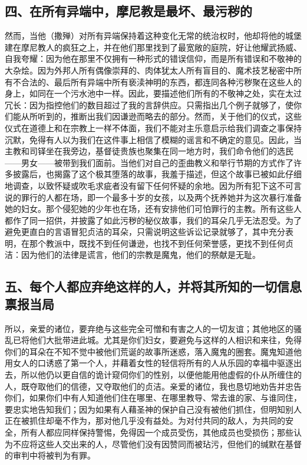 
\subsection{四、在所有异端中，摩尼教是最坏、最污秽的}

然而，当他（撒殚）对所有异端保持着这种变化无常的统治权时，他却将他的城堡建在摩尼教人的疯狂之上，并在他们那里找到了最宽敞的庭院，好让他耀武扬威、自我夸耀：因为他在那里不仅拥有一种形式的错误信仰，而是所有错误和不敬神的大杂烩。因为外邦人所有偶像崇拜的、肉体犹太人所有盲目的、魔术技艺秘密中所有不合法的、最后所有异端中所有亵渎神明的东西，都连同各种污秽聚在这些人的身上，如同在一个污水池中一样。因此，要描述他们所有的不敬神之处，实在太过冗长：因为指控他们的数目超过了我的言辞供应。只需指出几个例子就够了，使你们能从所听到的，推断出我们因谦逊而略去的部分。然而，关于他们的仪式，这些仪式在道德上和在宗教上一样不体面，我们不能对主乐意启示给我们调查之事保持沉默，免得有人以为我们在这件事上相信了模糊的谣言和不确定的意见。因此，当主教和司铎坐在我旁边，基督徒贵族也聚集在同一地方时，我们命令他们的选民——男女——被带到我们面前。当他们对自己的歪曲教义和举行节期的方式作了许多披露后，也揭露了这个极其堕落的故事，我羞于描述，但这个故事已被如此仔细地调查，以致怀疑或吹毛求疵者没有留下任何怀疑的余地。因为所有犯下这不可言说的罪行的人都在场，即一个最多十岁的女孩，以及两个抚养她并为这次暴行准备她的妇女。那个侵犯她的少年也在场，还有安排他们可怕罪行的主教。所有这些人都作了同一招供，并披露了如此污秽的秘仪故事，我们的耳朵几乎无法忍受。为了避免更直白的言语冒犯贞洁的耳朵，只需说明这些诉讼记录就够了，其中充分表明，在那个教派中，既找不到任何谦逊，也找不到任何荣誉感，更找不到任何贞洁：因为他们的法律是谎言，他们的宗教是魔鬼，他们的祭献是无耻。\par


\subsection{五、每个人都应弃绝这样的人，并将其所知的一切信息禀报当局}

所以，亲爱的诸位，要弃绝与这些完全可憎和有害之人的一切友谊；其他地区的骚乱已将他们大批带进此城。尤其是你们妇女，要避免与这样的人相识和来往，免得你们的耳朵在不知不觉中被他们荒诞的故事所迷惑，落入魔鬼的圈套。魔鬼知道他用女人的口诱惑了第一个人，并藉着女性的轻信将所有的人从乐园的幸福中驱逐出去，所以他仍以更自信的诡计窥伺你们的性别，以便他能用他虚假的仆从所缠住的人，既夺取他们的信德，又夺取他们的贞洁。亲爱的诸位，我也恳切地劝告并忠告你们，如果你们中有人知道他们住在哪里、在哪里教导、常去谁的家、与谁同住，要忠实地告知我们；因为如果有人藉圣神的保护自己没有被他们抓住，但明知别人正在被抓住却毫不作为，那对他几乎没有益处。为对付共同的敌人，为共同的安全，所有人都应同样保持警惕，免得因一个成员受伤，其他成员也受损伤；那些认为不应将这些人交出来的人，尽管他们没有因赞同而被玷污，但他们的缄默在基督的审判中将被判为有罪。\par

